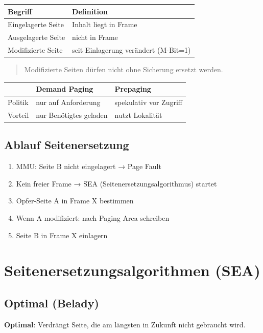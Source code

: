 \documentclass[11pt, a4paper]{article}
\begin{document}
{\small
\begin{tabularx}{\linewidth}{XX}
\hline
\rowcolor{tableheadbg}
{\color{white}\textbf{Begriff}} & {\color{white}\textbf{Definition}} \\[2pt]
\hline
\endhead
\hline
\endfoot
Eingelagerte Seite & Inhalt liegt in Frame \\
Ausgelagerte Seite & nicht in Frame \\
Modifizierte Seite & seit Einlagerung verändert (M-Bit=1) \\
\end{tabularx}
}


\begin{quote}
Modifizierte Seiten dürfen nicht ohne Sicherung ersetzt werden.
\end{quote}


{\small
\begin{tabularx}{\linewidth}{XXX}
\hline
\rowcolor{tableheadbg}
{\color{white}\textbf{}} & {\color{white}\textbf{Demand Paging}} & {\color{white}\textbf{Prepaging}} \\[2pt]
\hline
\endhead
\hline
\endfoot
Politik & nur auf Anforderung & spekulativ vor Zugriff \\
Vorteil & nur Benötigtes geladen & nutzt Lokalität \\
\end{tabularx}
}



\subsection{Ablauf Seitenersetzung}
\begin{enumerate}
  \item MMU: Seite B nicht eingelagert → Page Fault
  \item Kein freier Frame → SEA (Seitenersetzungsalgorithmus) startet
  \item Opfer-Seite A in Frame X bestimmen
  \item Wenn A modifiziert: nach Paging Area schreiben
  \item Seite B in Frame X einlagern
\end{enumerate}


\section{Seitenersetzungsalgorithmen (SEA)}


\subsection{Optimal (Belady)}
\textbf{Optimal}: Verdrängt Seite, die am längsten in Zukunft nicht gebraucht wird.
\end{document}
